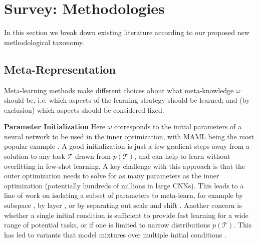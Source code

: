 \documentclass[10pt,journal,compsoc]{IEEEtran}
\newcommand{\keypoint}[1]{\vspace{0.1cm}\noindent\textbf{#1}\quad}
\begin{document}
\section{Survey: Methodologies}

In this section we break down existing literature according to our proposed new methodological taxonomy.

\subsection{Meta-Representation}\label{sec:what}

Meta-learning methods make different choices about what meta-knowledge $\omega$ should be, i.e. which aspects of the learning strategy should be learned; and (by exclusion) which aspects should be considered fixed.


\keypoint{Parameter Initialization} Here $\omega$ corresponds to the initial parameters of a neural network to be used in the inner optimization, with MAML being the most popular example \cite{finn2017maml,finn2018probabilistic,finn2019online}. A good initialization is just a few gradient steps away from a solution to any task $\mathcal{T}$ drawn from $p(\mathcal{T})$, and can help to learn without overfitting in few-shot learning. A key challenge with this approach is that the outer optimization needs to solve for as many parameters as the inner optimization (potentially hundreds of millions in large CNNs). This leads to a line of work on isolating a subset of parameters to meta-learn, for example by subspace \cite{lee2018mtnetmaml,rusu2019leo}, by layer \cite{antoniou2019learning,qiao2017parametersfromactivations,rusu2019leo}, or by separating out scale and shift \cite{sun2018metatransferfsl}. Another concern is whether a single initial condition is sufficient to provide fast learning for a wide range of potential tasks, or if one is limited to narrow distributions $p(\mathcal{T})$. This has led to variants that model mixtures over multiple initial conditions \cite{vuorio2019multimodalmaml, rusu2019leo, yao2019hierarchically}.
\end{document}
